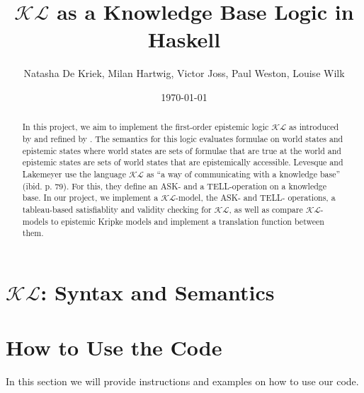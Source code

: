 \documentclass[12pt,a4paper]{article}
\title{$\mathcal{KL}$ as a Knowledge Base Logic in Haskell}
\author{Natasha De Kriek, Milan Hartwig, Victor Joss, Paul Weston, Louise Wilk}
\date{\today}
\begin{document}
\maketitle

\begin{abstract}
In this project, we aim to implement the first-order epistemic logic $\mathcal{KL}$ as introduced by \textcite{levesque1981} and refined by \textcite{Lokb}. 
The semantics for this logic evaluates formulae on world states and epistemic states where world states are sets of formulae that are true at the world and epistemic states are sets of world states that are epistemically accessible. Levesque and Lakemeyer use the language $\mathcal{KL}$ as ``a way of communicating with a knowledge base'' (ibid. p. 79). For this, they define an ASK- and a TELL-operation on a knowledge base. In our project, we implement a  $\mathcal{KL}$-model, the ASK- and TELL- operations, a tableau-based satisfiablity and validity checking for  $\mathcal{KL}$, as well as compare  $\mathcal{KL}$-models to epistemic Kripke models and implement a translation function between them.
\end{abstract}


\tableofcontents

\clearpage



\section{\texorpdfstring{$\mathcal{KL}$}{KL}: Syntax and Semantics}\label{sec:KLmodel}












% 

\section{How to Use the Code}

In this section we will provide instructions and examples on how to use our code.
\end{document}
